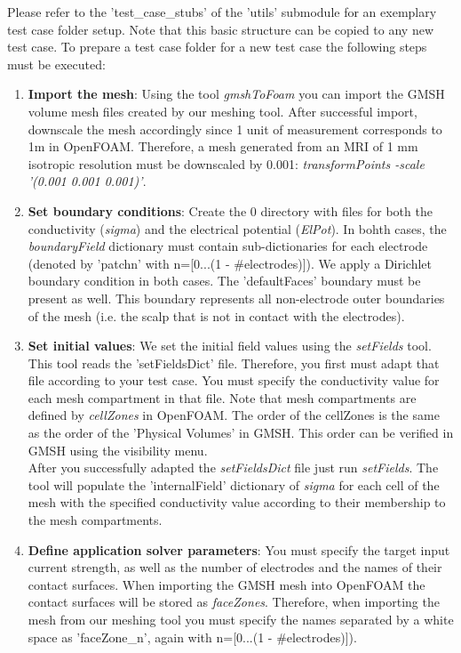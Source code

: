 Please refer to the 'test\_case\_stubs' of the 'utils' submodule for an exemplary test case folder setup. Note
that this basic structure can be copied to any new test case. To prepare a test case folder for a new test case
the following steps must be executed:
\begin{enumerate}
    \item \textbf{Import the mesh}: Using the tool \emph{gmshToFoam} you can import the GMSH volume mesh files
    created by our meshing tool. After successful import, downscale the mesh accordingly since 1 unit of measurement
    corresponds to 1m in OpenFOAM. Therefore, a mesh generated from an MRI of 1 mm isotropic resolution must be
    downscaled by 0.001: \emph{transformPoints -scale '(0.001 0.001 0.001)'}.

    \item \textbf{Set boundary conditions}: Create the 0 directory with files for both the conductivity (\emph{sigma})
    and the electrical potential (\emph{ElPot}). In bohth cases, the \emph{boundaryField} dictionary must contain
    sub-dictionaries for each electrode (denoted by 'patchn' with n=[0...(1 - \#electrodes)]). We apply a Dirichlet
    boundary condition in both cases. The 'defaultFaces' boundary must be present as well. This boundary represents
    all non-electrode outer boundaries of the mesh (i.e. the scalp that is not in contact with the electrodes).

    \item \textbf{Set initial values}: We set the initial field values using the \emph{setFields} tool. This
    tool reads the 'setFieldsDict' file. Therefore, you first must adapt that file according to your test case.
    You must specify the conductivity value for each mesh compartment in that file. Note that mesh compartments
    are defined by \emph{cellZones} in OpenFOAM. The order of the cellZones is the same as the order of the
    'Physical Volumes' in GMSH. This order can be verified in GMSH using the visibility menu.\\
    After you successfully adapted the \emph{setFieldsDict} file just run \emph{setFields}. The tool will populate
    the 'internalField' dictionary of \emph{sigma} for each cell of the mesh with the specified conductivity value 
    according to their membership to the mesh compartments.

    \item \textbf{Define application solver parameters}: You must specify the target input current strength, as well
    as the number of electrodes and the names of their contact surfaces. When importing the GMSH mesh into OpenFOAM
    the contact surfaces will be stored as \emph{faceZones}. Therefore, when importing the mesh from our meshing tool
    you must specify the names separated by a white space as 'faceZone\_n', again with n=[0...(1 - \#electrodes)]).


\end{enumerate}
